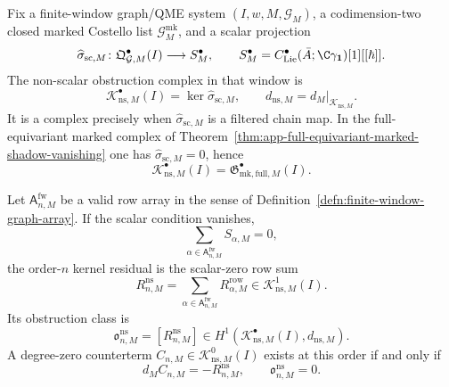 \begin{defn}
\label{def:app-nonscalar-kernel-row-complex}
  Fix a finite-window graph/QME system
  \((I,w,M,\mathcal G_M)\), a codimension-two closed marked Costello list
  \(\mathcal G^{\mathrm{mk}}_M\), and a scalar projection
  \[
    \widehat\sigma_{\mathrm{sc},M}\colon
    \mathfrak Q^\bullet_{\mathcal G,M}(I)
      \longrightarrow
    S^\bullet_M,\qquad
    S^\bullet_M=
    C^\bullet_{\mathrm{Lie}}(\bar A;\C\gamma_{\mathbf 1})[1][[\hbar]] .
  \]
  The non-scalar obstruction complex in that window is
  \[
    \mathcal K^\bullet_{\mathrm{ns},M}(I)
      =
    \ker\widehat\sigma_{\mathrm{sc},M},
    \qquad
    d_{\mathrm{ns},M}=d_M|_{\mathcal K_{\mathrm{ns},M}} .
  \]
  It is a complex precisely when \(\widehat\sigma_{\mathrm{sc},M}\) is a
  filtered chain map.  In the full-equivariant marked complex of
  Theorem~\ref{thm:app-full-equivariant-marked-shadow-vanishing} one has
  \(\widehat\sigma_{\mathrm{sc},M}=0\), hence
  \[
    \mathcal K^\bullet_{\mathrm{ns},M}(I)
      =
    \mathfrak G^\bullet_{\mathrm{mk,full},M}(I).
  \]

  Let \(\mathsf A^{\mathrm{fw}}_{n,M}\) be a valid row array in the sense
  of Definition~\ref{defn:finite-window-graph-array}.  If the scalar condition
  vanishes,
  \[
    \sum_{\alpha\in\mathsf A^{\mathrm{fw}}_{n,M}}S_{\alpha,M}=0,
  \]
  the order-\(n\) kernel residual is the scalar-zero row sum
  \[
    R^{\mathrm{ns}}_{n,M}
      =
    \sum_{\alpha\in\mathsf A^{\mathrm{fw}}_{n,M}}
      R^{\mathrm{row}}_{\alpha,M}
      \in\mathcal K^1_{\mathrm{ns},M}(I).
  \]
  Its obstruction class is
  \[
    \mathfrak o^{\mathrm{ns}}_{n,M}
      =
    [R^{\mathrm{ns}}_{n,M}]
      \in
    H^1\!\left(
      \mathcal K^\bullet_{\mathrm{ns},M}(I),d_{\mathrm{ns},M}
    \right).
  \]
  A degree-zero counterterm
  \(C_{n,M}\in\mathcal K^0_{\mathrm{ns},M}(I)\) exists at this order if
  and only if
  \[
    d_M C_{n,M}=-R^{\mathrm{ns}}_{n,M},
    \qquad
    \mathfrak o^{\mathrm{ns}}_{n,M}=0.
  \]
\end{defn}

